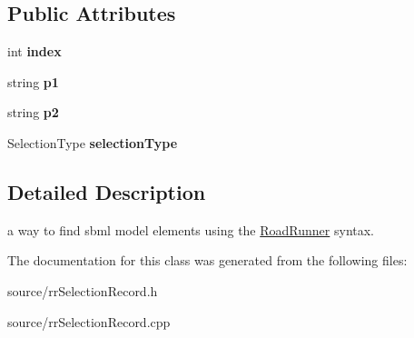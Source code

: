 \subsection*{Public Attributes}
\begin{DoxyCompactItemize}
\item 
\hypertarget{classrr_1_1_selection_record_a82a0f91850fedab552cf932a1404b41b}{int {\bfseries index}}\label{classrr_1_1_selection_record_a82a0f91850fedab552cf932a1404b41b}

\item 
\hypertarget{classrr_1_1_selection_record_ad97672baac3b6608f10a253d8594d39b}{string {\bfseries p1}}\label{classrr_1_1_selection_record_ad97672baac3b6608f10a253d8594d39b}

\item 
\hypertarget{classrr_1_1_selection_record_a541046e11c7748d5fe403cbb681629a5}{string {\bfseries p2}}\label{classrr_1_1_selection_record_a541046e11c7748d5fe403cbb681629a5}

\item 
\hypertarget{classrr_1_1_selection_record_adae706f827ce8b7c3873b2fd77fa833c}{Selection\-Type {\bfseries selection\-Type}}\label{classrr_1_1_selection_record_adae706f827ce8b7c3873b2fd77fa833c}

\end{DoxyCompactItemize}


\subsection{Detailed Description}
a way to find sbml model elements using the \hyperlink{classrr_1_1_road_runner}{Road\-Runner} syntax. 

The documentation for this class was generated from the following files\-:\begin{DoxyCompactItemize}
\item 
source/rr\-Selection\-Record.\-h\item 
source/rr\-Selection\-Record.\-cpp\end{DoxyCompactItemize}
